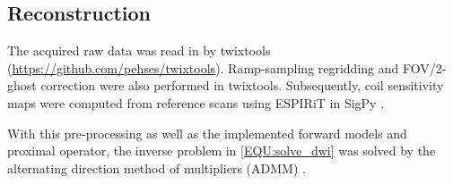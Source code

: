 \documentclass[preprint,12pt,authoryear,review]{elsarticle}
\begin{document}
\begin{enumerate}[I.]
    \end{enumerate}

    \subsection{Reconstruction}

    The acquired raw data was read in by twixtools
    (\url{https://github.com/pehses/twixtools}).
    Ramp-sampling regridding and FOV/2-ghost correction were also performed in twixtools.
    Subsequently, coil sensitivity maps were computed from reference scans
    using ESPIRiT \citep{uecker_2014_espirit} in SigPy \citep{ong_2019_sigpy}.

    With this pre-processing as well as
    the implemented forward models and proximal operator,
    the inverse problem in \cref{EQU:solve_dwi} was solved by
    the alternating direction method of multipliers (ADMM) \citep{boyd_2010_admm}.
\end{document}
